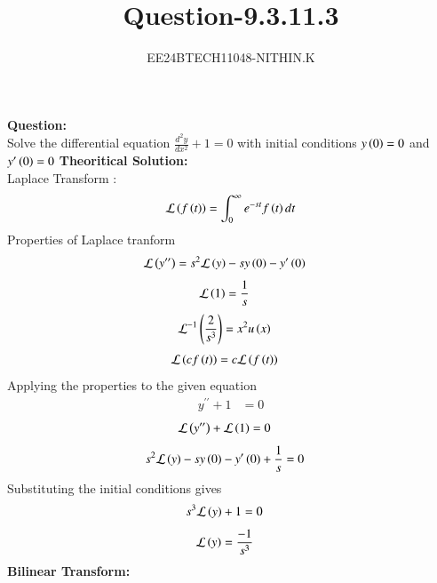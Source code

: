 \documentclass[journal]{IEEEtran}
\numberwithin{equation}{enumi}
\numberwithin{figure}{enumi}
\begin{document}


\title{Question-9.3.11.3}
\author{EE24BTECH11048-NITHIN.K} 
{\let\newpage\relax\maketitle}
\textbf{Question:} \\
Solve the differential equation $\frac{d^2y}{dx^2} + 1 = 0$ with initial conditions $y\left(0\right) = 0$ and $y^{\prime}\left(0\right) = 0$
\textbf{Theoritical Solution:} \\
Laplace Transform :\\
\begin{align}
	\mathcal{L}\left(f\left(t\right)\right) = \int_{0}^{\infty}e^{-st}f\left(t\right)dt
\end{align}
Properties of Laplace tranform
\begin{align}
	\mathcal{L}\left(y^{\prime\prime}\right) &= s^2\mathcal{L}\left(y\right) -sy\left(0\right)-y^\prime\left(0\right)
\end{align}
\begin{align}
	\mathcal{L}\left(1\right) &= \frac{1}{s}
\end{align}
\begin{align}
	\mathcal{L}^{-1}\left(\frac{2}{s^3}\right) &= x^2u\left(x\right)
\end{align}
\begin{align}
	\mathcal{L}\left(cf\left(t\right)\right) &= c\mathcal{L}\left(f\left(t\right)\right)
\end{align}
Applying the properties to the given equation
\begin{align}
	y^{\prime\prime} + 1 &= 0
\end{align}
\begin{align}
	\mathcal{L}\left(y^{\prime\prime}\right) + \mathcal{L}\left(1\right) &= 0
\end{align}
\begin{align}
	s^2\mathcal{L}\left(y\right) -sy\left(0\right)-y^\prime\left(0\right)+\frac{1}{s} &= 0
\end{align}
Substituting the initial conditions gives
\begin{align}
	s^3\mathcal{L}\left(y\right) + 1 &= 0
\end{align}
\begin{align}
	\mathcal{L}\left(y\right) &= \frac{-1}{s^3}
\end{align}
\textbf{Bilinear Transform:} \\
\end{document}
